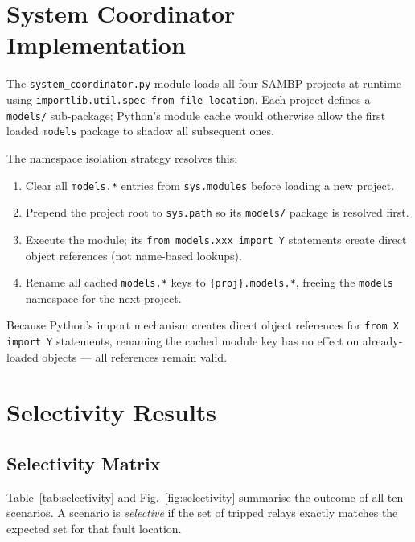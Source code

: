 \documentclass[12pt,a4paper]{article}
\begin{document}
\section{System Coordinator Implementation}

The \texttt{system\_coordinator.py} module loads all four SAMBP projects
at runtime using \texttt{importlib.util.spec\_from\_file\_location}.
Each project defines a \texttt{models/} sub-package; Python's module
cache would otherwise allow the first loaded \texttt{models} package to
shadow all subsequent ones.

The namespace isolation strategy resolves this:
\begin{enumerate}
  \item Clear all \texttt{models.*} entries from \texttt{sys.modules}
        before loading a new project.
  \item Prepend the project root to \texttt{sys.path} so its
        \texttt{models/} package is resolved first.
  \item Execute the module; its \texttt{from models.xxx import Y}
        statements create direct object references (not name-based
        lookups).
  \item Rename all cached \texttt{models.*} keys to
        \texttt{\{proj\}.models.*}, freeing the \texttt{models} namespace
        for the next project.
\end{enumerate}

Because Python's import mechanism creates direct object references for
\texttt{from X import Y} statements, renaming the cached module key has
no effect on already-loaded objects --- all references remain valid.

\section{Selectivity Results}

\subsection{Selectivity Matrix}

Table~\ref{tab:selectivity} and Fig.~\ref{fig:selectivity} summarise the
outcome of all ten scenarios.  A scenario is \emph{selective} if the set
of tripped relays exactly matches the expected set for that fault
location.
\end{document}
